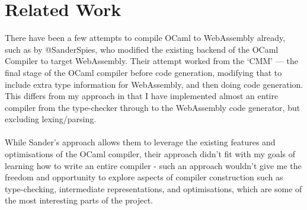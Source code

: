 


\section{Related Work}

There have been a few attempts to compile OCaml to WebAssembly already, such as by @SanderSpies\cite{Awbfo}, who modified the existing backend of the OCaml Compiler to target WebAssembly. Their attempt worked from the `CMM' --- the final stage of the OCaml compiler before code generation, modifying that to include extra type information for WebAssembly, and then doing code generation. This differs from my approach in that I have implemented almost an entire compiler from the type-checker through to the WebAssembly code generator, but excluding lexing/parsing.
\\\\
While Sander's approach allows them to leverage the existing features and optimisations of the OCaml compiler, their approach didn't fit with my goals of learning how to write an entire compiler - such an approach wouldn't give me the freedom and opportunity to explore aspects of compiler construction such as type-checking, intermediate representations, and optimisations, which are some of the most interesting parts of the project.